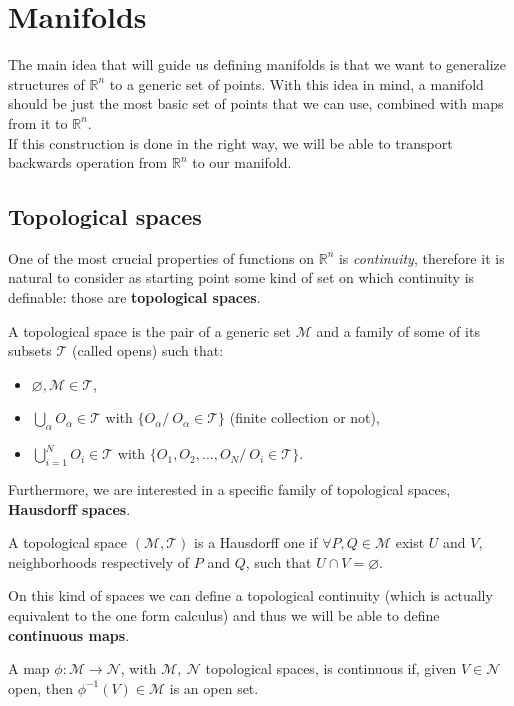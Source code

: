 \section{Manifolds}
The main idea that will guide us defining manifolds is that we want to generalize structures of $\mathbb{R}^n$ to a generic set of points. With this idea in mind, a manifold should be just the most basic set of points that we can use, combined with maps from it to $\mathbb{R}^n$.\\ If this construction is done in the right way, we will be able to transport backwards operation from $\mathbb{R}^n$ to our manifold.
\subsection{Topological spaces}
One of the most crucial properties of functions on $\mathbb{R}^n$ is \emph{continuity}, therefore it is natural to consider as starting point some kind of set on which continuity is definable: those are \textbf{topological spaces}. 
\begin{defin}
	A topological space is the pair of a generic set $\mathcal{M}$ and a family of some of its subsets $\mathcal{T}$ (called opens) such that:
    \begin{itemize}
	       \item $\varnothing,\mathcal{M} \in \mathcal{T}$,
	       \item $\bigcup_\alpha O_\alpha\in\mathcal{T}$ with $\{O_\alpha/\  O_\alpha \in\mathcal{T}\}$ (finite collection or not),
	       \item $\bigcup_{i=1}^N O_i\in\mathcal{T}$ with $\{O_1,O_2,...,O_N /\ O_i \in\mathcal{T}\}$.
    \end{itemize}
\end{defin}
Furthermore, we are interested in a specific family of topological spaces, \textbf{Hausdorff spaces}.
\begin{defin}
	A topological space $(\mathcal{M},\mathcal{T} )$ is a Hausdorff one if $\forall P,Q\in\mathcal{M}$ exist $U$ and $V$, neighborhoods respectively of $P$ and $Q$, such that $U\cap V=\varnothing$. 
\end{defin}
On this kind of spaces we can define a topological continuity (which is actually equivalent to the one form calculus) and thus we will be able to define \textbf{continuous maps}.
\begin{defin}
A map $\phi:\mathcal{M}\rightarrow\mathcal{N} $, with $\mathcal{M},\ \mathcal{N} $ topological spaces, is continuous if, given $V\in\mathcal{N}$ open, then $\phi^{-1}(V)\in\mathcal{M}$ is an open set.
\end{defin}
